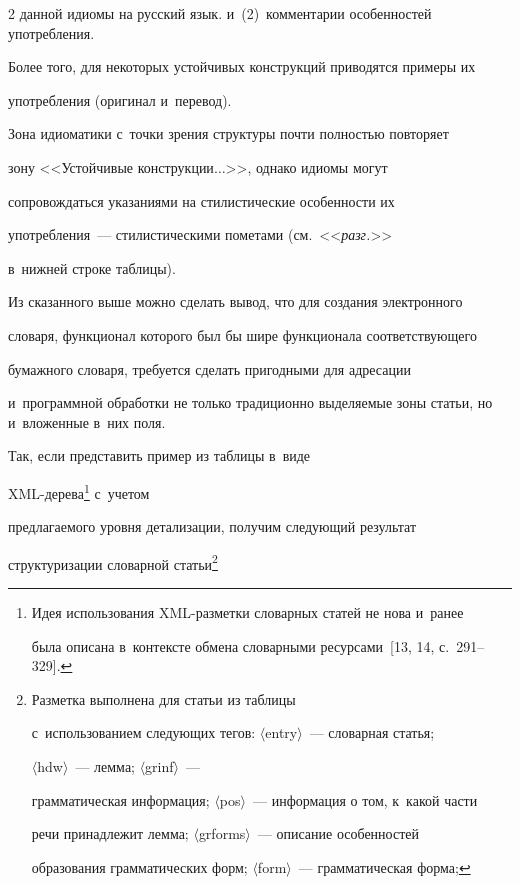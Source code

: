 \begin{multicols}{2}
{данной идиомы на русский язык.} и~(2)~комментарии особенностей употребления. 


Более того, для некоторых устойчивых конструкций приводятся примеры их 


употребления (оригинал и~перевод).


  


  Зона идиоматики с~точки зрения структуры почти полностью повторяет 


зону <<Устойчивые конструкции$\ldots$>>, однако идиомы могут 


со\-про\-вож\-дать\-ся указаниями на стилистические особенности их 


употребления~--- стилистическими пометами (см.\ <<\textit{разг.}>> 


в~нижней строке таблицы).


  


  Из сказанного выше можно сделать вывод, что для создания электронного 


словаря, функционал которого был бы шире функционала соответствующего 


бумажного словаря, требуется сделать пригодными для адресации 


и~программной обработки не только традиционно выделяемые зоны статьи, но и~вложенные в~них поля. 


Так, если представить пример из таблицы в~виде  


XML-де\-ре\-ва\footnote{Идея использования XML-разметки словарных статей не нова и~ранее 


была описана в~контексте обмена словарными ресурсами~[13, 14, с.~291--329].} с~учетом 


предлагаемого уровня детализации, получим следующий результат 


структуризации словарной статьи\footnote{Разметка выполнена для статьи из таблицы 


с~использованием следующих тегов: $\langle${\sf entry}$\rangle$~--- словарная статья; 


$\langle${\sf hdw}$\rangle$~--- лемма; $\langle${\sf grinf}$\rangle$~--- 


грамматическая информация; $\langle${\sf pos}$\rangle$~--- информация о том, к~какой части 


речи принадлежит лемма; $\langle${\sf grforms}$\rangle$~--- описание особенностей 


образования грамматических форм; $\langle${\sf form}$\rangle$~--- грамматическая форма; 


}
\end{multicols}
